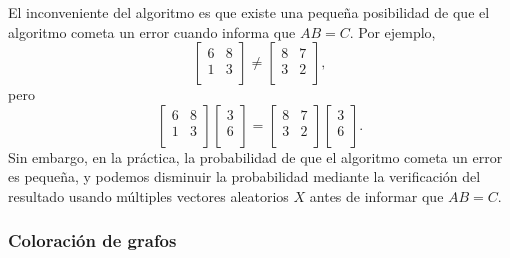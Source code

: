 El inconveniente del algoritmo es
que existe una pequeña posibilidad de que el algoritmo
cometa un error cuando informa que $AB=C$.
Por ejemplo, 
\[
 \begin{bmatrix}
  6 & 8 \\
  1 & 3 \\
 \end{bmatrix}
\neq
 \begin{bmatrix}
  8 & 7 \\
  3 & 2 \\
 \end{bmatrix},
\]
pero
\[
 \begin{bmatrix}
  6 & 8 \\
  1 & 3 \\
 \end{bmatrix}
 \begin{bmatrix}
  3 \\
  6 \\
 \end{bmatrix}
=
 \begin{bmatrix}
  8 & 7 \\
  3 & 2 \\
 \end{bmatrix}
 \begin{bmatrix}
  3 \\
  6 \\
 \end{bmatrix}.
\]
Sin embargo, en la práctica, la probabilidad de que el
algoritmo cometa un error es pequeña,
y podemos disminuir la probabilidad mediante
la verificación del resultado usando múltiples vectores aleatorios $X$
antes de informar que $AB=C$.

\subsubsection{Coloración de grafos}

